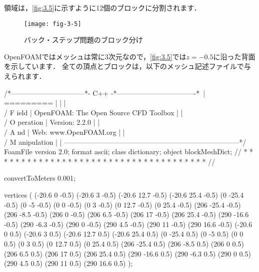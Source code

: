 領域は，\autoref{fig:3.5}に示すように12個のブロックに分割されます．


\begin{figure}[ht]
 \texttt{[image: fig-3-5]}
 \caption{バック・ステップ問題のブロック分け}
 \label{fig:3.5}
\end{figure}


OpenFOAMではメッシュは常に3次元なので，\autoref{fig:3.5}では$z = -0.5$に沿った背面を示しています．
全ての頂点とブロックは，以下のメッシュ記述ファイルで与えられます．
\begin{OFverbatim}
/*--------------------------------*- C++ -*----------------------------------*\
| =========                 |                                                 |
| \\      /  F ield         | OpenFOAM: The Open Source CFD Toolbox           |
|  \\    /   O peration     | Version:  2.2.0                                 |
|   \\  /    A nd           | Web:      www.OpenFOAM.org                      |
|    \\/     M anipulation  |                                                 |
\*---------------------------------------------------------------------------*/
FoamFile
{
    version     2.0;
    format      ascii;
    class       dictionary;
    object      blockMeshDict;
}
// * * * * * * * * * * * * * * * * * * * * * * * * * * * * * * * * * * * * * //

convertToMeters 0.001;

vertices
(
    (-20.6 0 -0.5)
    (-20.6 3 -0.5)
    (-20.6 12.7 -0.5)
    (-20.6 25.4 -0.5)
    (0 -25.4 -0.5)
    (0 -5 -0.5)
    (0 0 -0.5)
    (0 3 -0.5)
    (0 12.7 -0.5)
    (0 25.4 -0.5)
    (206 -25.4 -0.5)
    (206 -8.5 -0.5)
    (206 0 -0.5)
    (206 6.5 -0.5)
    (206 17 -0.5)
    (206 25.4 -0.5)
    (290 -16.6 -0.5)
    (290 -6.3 -0.5)
    (290 0 -0.5)
    (290 4.5 -0.5)
    (290 11 -0.5)
    (290 16.6 -0.5)
    (-20.6 0 0.5)
    (-20.6 3 0.5)
    (-20.6 12.7 0.5)
    (-20.6 25.4 0.5)
    (0 -25.4 0.5)
    (0 -5 0.5)
    (0 0 0.5)
    (0 3 0.5)
    (0 12.7 0.5)
    (0 25.4 0.5)
    (206 -25.4 0.5)
    (206 -8.5 0.5)
    (206 0 0.5)
    (206 6.5 0.5)
    (206 17 0.5)
    (206 25.4 0.5)
    (290 -16.6 0.5)
    (290 -6.3 0.5)
    (290 0 0.5)
    (290 4.5 0.5)
    (290 11 0.5)
    (290 16.6 0.5)
);


\end{OFverbatim}
